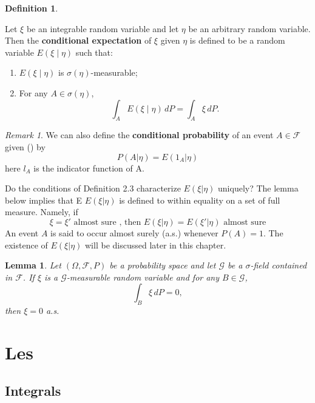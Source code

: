 \documentclass[
]{book}
\providecommand{\tightlist}{%
  \setlength{\itemsep}{0pt}\setlength{\parskip}{0pt}}
\newtheorem{lemma}{Lemma}[chapter]
\theoremstyle{definition}
\newtheorem{definition}{Definition}[chapter]
\theoremstyle{definition}
\theoremstyle{definition}
\theoremstyle{definition}
\theoremstyle{remark}
\newtheorem*{remark}{Remark}
\begin{document}
\begin{definition}
\protect\hypertarget{def:unnamed-chunk-54}{}\label{def:unnamed-chunk-54}

Let \(\xi\) be an integrable random variable and let \(\eta\) be an arbitrary random variable. Then the \textbf{conditional expectation} of \(\xi\) given \(\eta\) is defined to be a random variable \(E(\xi \mid \eta)\) such that:

\begin{enumerate}
\def\labelenumi{\arabic{enumi}.}
\tightlist
\item
  \(E(\xi \mid \eta)\) is \(\sigma(\eta)\)-measurable;
\item
  For any \(A \in \sigma(\eta)\),
  \[
  \int_A E(\xi \mid \eta) \, dP = \int_A \xi \, dP.
  \]
\end{enumerate}

\end{definition}

\begin{remark}
We can also define the \textbf{conditional probability} of an event \(A \in \mathcal{F}\) given (\eta) by
\[P(A|\eta)=E(1_A|\eta)\]
here \(l_A\) is the indicator function of A.
\end{remark}

Do the conditions of Definition 2.3 characterize \(E (\xi|\eta)\) uniquely? The lemma below implies that E \(E (\xi|\eta)\) is defined to within equality on a set of full measure. Namely,
if \[\xi=\xi' \text{ almost sure  , then } E (\xi|\eta) = E (\xi'|\eta) \text{ almost sure}\]
An event \(A\) is said to occur almost surely (a.s.) whenever \(P(A) = 1\).
The existence of \(E (\xi|\eta)\) will be discussed later in this chapter.

\begin{lemma}
\protect\hypertarget{lem:unnamed-chunk-56}{}\label{lem:unnamed-chunk-56}Let \((\Omega, \mathcal{F}, P)\) be a probability space and let \(\mathcal{G}\) be a \(\sigma\)-field contained in \(\mathcal{F}\). If \(\xi\) is a \(\mathcal{G}\)-measurable random variable and for any \(B \in \mathcal{G}\),
\[
\int_B \xi \, dP = 0,
\]
then \(\xi = 0\) a.s.
\end{lemma}

\chapter{Les}\label{les}

\section{Integrals}\label{integrals}
\end{document}
